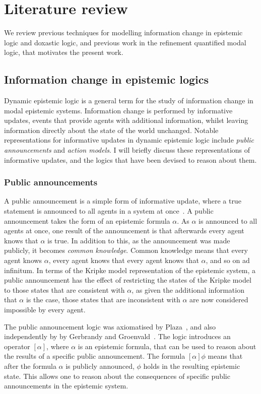\chapter{Literature review}\label{litreview}

We review previous techniques for modelling information change in epistemic
logic and doxastic logic, and previous work in the refinement quantified modal
logic, that motivates the present work.

\section{Information change in epistemic logics}

Dynamic epistemic logic is a general term for the study of information change in
modal epistemic systems. Information change is performed by informative updates,
events that provide agents with additional information, whilst leaving
information directly about the state of the world unchanged. Notable
representations for informative updates in dynamic epistemic logic include {\em
public announcements} and {\em action models}. I will briefly discuss these
representations of informative updates, and the logics that have been devised to
reason about them.

\subsection{Public announcements}

A public announcement is a simple form of informative update, where a true
statement is announced to all agents in a system at
once~\cite{vanditmarsch2007dynamic}.  A public announcement takes the form of an
epistemic formula $\alpha$. As $\alpha$ is announced to all agents at once, one
result of the announcement is that afterwards every agent knows that $\alpha$ is
true. In addition to this, as the announcement was made publicly, it becomes
{\em common knowledge}. Common knowledge means that every agent knows $\alpha$,
every agent knows that every agent knows that $\alpha$, and so on ad infinitum.
In terms of the Kripke model representation of the epistemic system, a public
announcement has the effect of restricting the states of the Kripke model to
those states that are consistent with $\alpha$, as given the additional
information that $\alpha$ is the case, those states that are inconsistent with
$\alpha$ are now considered impossible by every agent.

The public announcement logic was axiomatised by Plaza~\cite{plaza2007logics},
and also independently by by Gerbrandy and
Groenvald~\cite{gerbrandy1997reasoning}.  The logic introduces an operator
$[\alpha]$, where $\alpha$ is an epistemic formula, that can be used to reason
about the results of a specific public announcement. The formula $[\alpha]
\phi$ means that after the formula $\alpha$ is publicly announced, $\phi$ holds
in the resulting epistemic state. This allows one to reason about the
consequences of specific public announcements in the epistemic system.


